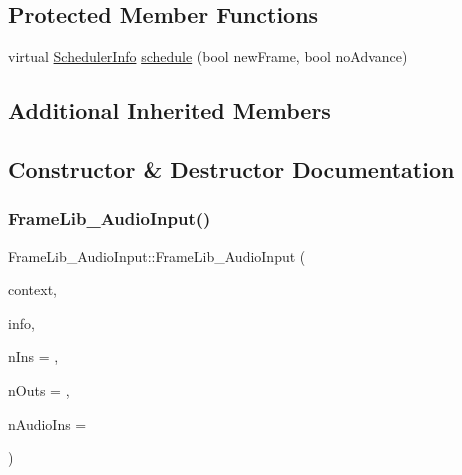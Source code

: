 \subsection*{Protected Member Functions}
\begin{DoxyCompactItemize}
\item 
virtual \hyperlink{struct_frame_lib___d_s_p_1_1_scheduler_info}{Scheduler\+Info} \hyperlink{class_frame_lib___audio_input_aaa16c1cb4486b196362b5edf1c60f689}{schedule} (bool new\+Frame, bool no\+Advance)
\end{DoxyCompactItemize}
\subsection*{Additional Inherited Members}


\subsection{Constructor \& Destructor Documentation}
\mbox{\label{class_frame_lib___audio_input_ae4d7b6fccecd6cb0de7884f89ab7875e}} 
\subsubsection{\texorpdfstring{Frame\+Lib\+\_\+\+Audio\+Input()}{FrameLib\_AudioInput()}}
{\footnotesize\ttfamily Frame\+Lib\+\_\+\+Audio\+Input\+::\+Frame\+Lib\+\_\+\+Audio\+Input (\begin{DoxyParamCaption}\item[{\hyperlink{class_frame_lib___context}{Frame\+Lib\+\_\+\+Context}}]{context,  }\item[{\hyperlink{class_frame_lib___parameters_1_1_info}{Frame\+Lib\+\_\+\+Parameters\+::\+Info} $\ast$}]{info,  }\item[{unsigned long}]{n\+Ins = {},  }\item[{unsigned long}]{n\+Outs = {},  }\item[{unsigned long}]{n\+Audio\+Ins = {} }\end{DoxyParamCaption})\hspace{0.3cm}{\ttfamily [inline]}}




